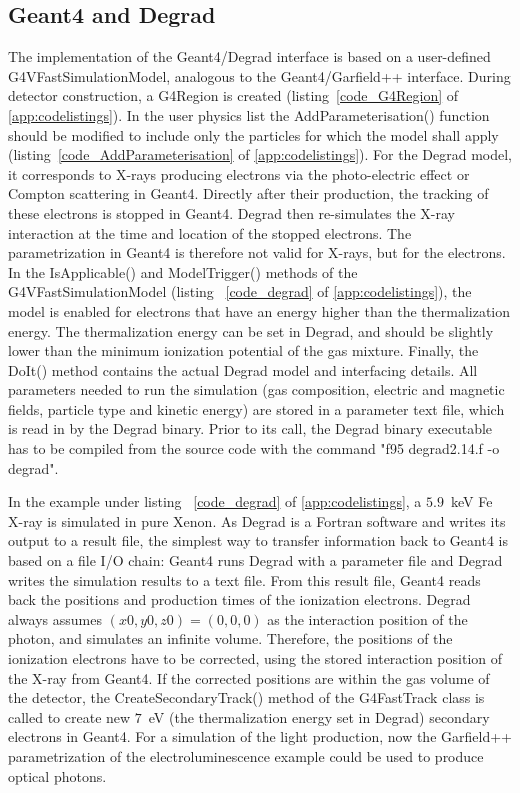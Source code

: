\documentclass[preprint,12pt,sort&compress]{elsarticle}
\begin{document}
\subsection{Geant4 and Degrad}\label{Implementation Degrad}
The implementation of the Geant4/Degrad interface is based on a user-defined G4VFast\-Simulation\-Model, analogous to the Geant4/Garfield++ interface. During detector construction, a G4Region is created (listing~\ref{code_G4Region} of \ref{app:codelistings}). In the user physics list the AddParameterisation() function should be modified to include only the particles for which the model shall apply (listing~\ref{code_AddParameterisation} of \ref{app:codelistings}). For the Degrad model, it corresponds to X-rays producing electrons via the photo-electric effect or Compton scattering in Geant4. Directly after their production, the tracking of these electrons is stopped in Geant4. Degrad then re-simulates the X-ray interaction at the time and location of the stopped electrons. The parametrization in Geant4 is therefore not valid for X-rays, but for the electrons. In the IsApplicable() and ModelTrigger() methods of the G4VFast\-Simulation\-Model (listing ~\ref{code_degrad} of \ref{app:codelistings}), the model is enabled for electrons that have an energy higher than the thermalization energy. The thermalization energy can be set in Degrad, and should be slightly lower than the minimum ionization potential of the gas mixture. Finally, the DoIt() method contains the actual Degrad model and interfacing details. All parameters needed to run the simulation (gas composition, electric and magnetic fields, particle type and kinetic energy) are stored in a parameter text file, which is read in by the Degrad binary. Prior to its call, the Degrad binary executable has to be compiled from the source code with the command "f95 degrad2.14.f -o degrad". 

In the example under listing ~\ref{code_degrad} of \ref{app:codelistings}, a $5.9$~keV Fe X-ray is simulated in pure Xenon. As Degrad is a Fortran software and writes its output to a result file, the simplest way to transfer information back to Geant4 is based on a file I/O chain: Geant4 runs Degrad with a parameter file and Degrad writes the simulation results to a text file. From this result file, Geant4 reads back the positions and production times of the ionization electrons. Degrad always assumes $(x0,y0,z0)=(0,0,0)$ as the interaction position of the photon, and simulates an infinite volume. Therefore, the positions of the ionization electrons have to be corrected, using the stored interaction position of the X-ray from Geant4. If the corrected positions are within the gas volume of the detector, the CreateSecondaryTrack() method of the G4FastTrack class is called to create new $7$~eV (the thermalization energy set in Degrad) secondary electrons in Geant4. For a simulation of the light production, now the Garfield++ parametrization of the electroluminescence example could be used to produce optical photons.
\end{document}
